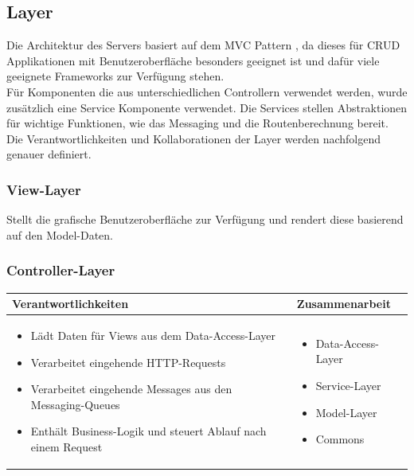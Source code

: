 \subsection{Layer}
Die Architektur des Servers basiert auf dem {MVC Pattern \cite{MVC}}, da dieses für \Gls{CRUD} Applikationen mit Benutzeroberfläche besonders geeignet ist und dafür viele geeignete Frameworks zur Verfügung stehen.\\

Für Komponenten die aus unterschiedlichen Controllern verwendet werden, wurde zusätzlich eine Service Komponente verwendet. Die Services stellen Abstraktionen für wichtige Funktionen, wie das Messaging und die Routenberechnung bereit.\\

Die Verantwortlichkeiten und Kollaborationen der Layer werden nachfolgend genauer definiert.

\subsubsection{View-Layer}
Stellt die grafische Benutzeroberfläche zur Verfügung und rendert diese basierend auf den Model-Daten.

\subsubsection{Controller-Layer}
\begin{tabular}{|p{}|p{}|} \hline
	\textbf{Verantwortlichkeiten} & \textbf{Zusammenarbeit} \\ \hline \hline
	\begin{itemize}
		\item Lädt Daten für Views aus dem Data-Access-Layer
		\item Verarbeitet eingehende HTTP-Requests
		\item Verarbeitet eingehende Messages aus den Messaging-Queues
		\item Enthält Business-Logik und steuert Ablauf nach einem Request	
	\end{itemize}&
	\begin{itemize}
		\item Data-Access-Layer
		\item Service-Layer
		\item Model-Layer
		\item Commons
	\end{itemize}
	\\ \hline
\end{tabular}

